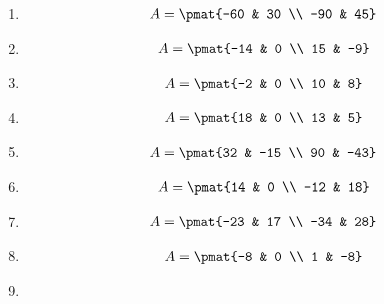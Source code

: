 \begin{enumerate}

\item

\begin{align*}
A = \pmat{-60 & 30 \\ -90 & 45}
\end{align*}

\item

\begin{align*}
A = \pmat{-14 & 0 \\ 15 & -9}
\end{align*}

\item

\begin{align*}
A = \pmat{-2 & 0 \\ 10 & 8}
\end{align*}

\item

\begin{align*}
A = \pmat{18 & 0 \\ 13 & 5}
\end{align*}

\item

\begin{align*}
A = \pmat{32 & -15 \\ 90 & -43}
\end{align*}

\item

\begin{align*}
A = \pmat{14 & 0 \\ -12 & 18}
\end{align*}

\item

\begin{align*}
A = \pmat{-23 & 17 \\ -34 & 28}
\end{align*}

\item

\begin{align*}
A = \pmat{-8 & 0 \\ 1 & -8}
\end{align*}

\item


\end{enumerate}
